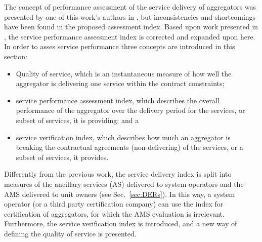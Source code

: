 The concept of performance assessment of the service delivery of aggregators was presented by one of this work's authors in \cite{bondy2014performance}, but inconsistencies and shortcomings have been found in the proposed assessment index. Based upon work presented in \cite{thavlov2015thesis}, the service performance assessment index is corrected and expanded upon here. In order to asses service performance three concepts are introduced in this section:
\begin{itemize}
\item Quality of service, which is an instantaneous measure of how well the aggregator is delivering one service within the contract constraints;
\item service performance assessment index, which describes the overall performance of the aggregator over the delivery period for the services, or subset of services, it is providing; and a
\item service verification index, which describes how much an aggregator is breaking the contractual agreements (non-delivering) of the services, or a subset of services, it provides.
\end{itemize}

Differently from the previous work, the service delivery index is split into measures of the ancillary services (AS) delivered to system operators and the AMS delivered to unit owners (see Sec.~\ref{sec:DERs}). In this way, a system operator (or a third party certification company) can use the index for certification of aggregators, for which the AMS evaluation is irrelevant. Furthermore, the service verification index is introduced, and a new way of defining the quality of service is presented.

